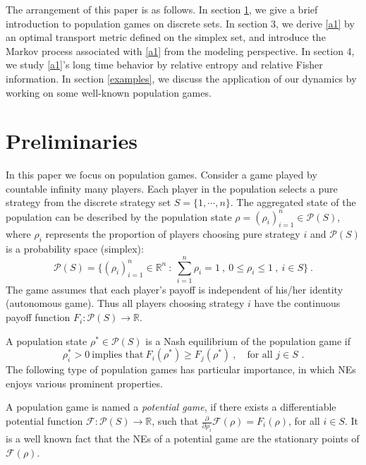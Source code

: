 \documentclass[11pt,reqno]{amsart}
\begin{document}
The arrangement of this paper is as follows. In section \ref{Game}, we give a brief introduction to population games on discrete sets. In section 3, we derive \eqref{a1} by an optimal transport metric defined on the simplex set, and introduce the Markov process associated with \eqref{a1} from the modeling perspective. In section 4, we study \eqref{a1}'s long time behavior by relative entropy and relative Fisher information. In section \ref{examples}, we discuss the application of our dynamics by working on some well-known population games.

\section{Preliminaries}\label{Game}


In this paper we focus on population games. Consider a game played by countable infinity many players. Each player in the population selects a pure strategy from the discrete
strategy set $S=\{1,\cdots, n\}$. The aggregated state of the population can be described by the population state $\rho=(\rho_i)_{i=1}^n\in \mathcal{P}(S)$, where $\rho_i$ represents the proportion of players choosing pure strategy $i$ and $\mathcal{P}(S)$ is a probability space (simplex):
\begin{equation*}\label{probs}
\mathcal{P}(S)=\{(\rho_i)_{i=1}^n\in\mathbb{R}^n~:~\sum_{i=1}^n \rho_i=1\ , ~0\leq \rho_i\leq 1\ ,~i\in S\}\ .
\end{equation*}
The game assumes that each player's payoff is independent of his/her identity (autonomous game). Thus all players choosing strategy $i$ have the continuous payoff function $F_{i}:
\mathcal{P}(S)\rightarrow \mathbb{R}$.  


A population state $\rho^*\in \mathcal{P}(S)$ is a Nash equilibrium of the population game if
\begin{equation*}
\rho_i^*>0 ~\textrm{implies that} ~F_i(\rho^*)\geq F_j(\rho^*)\ ,\quad\textrm{for all $j\in S$\ .}
\end{equation*}
The following type of population games has particular importance, in which NEs enjoys various prominent properties.

{A population game is named a {\em potential game}, if there exists a differentiable potential function $\mathcal{F}: \mathcal{P}(S)\rightarrow \mathbb{R}$, such that $\frac{\partial}{\partial\rho_i}\mathcal{F}(\rho)=F_i(\rho)$, for all $i\in S$.}
It is a well known fact that the NEs of a potential game are the
stationary points of $\mathcal{F}(\rho)$.
\end{document}

